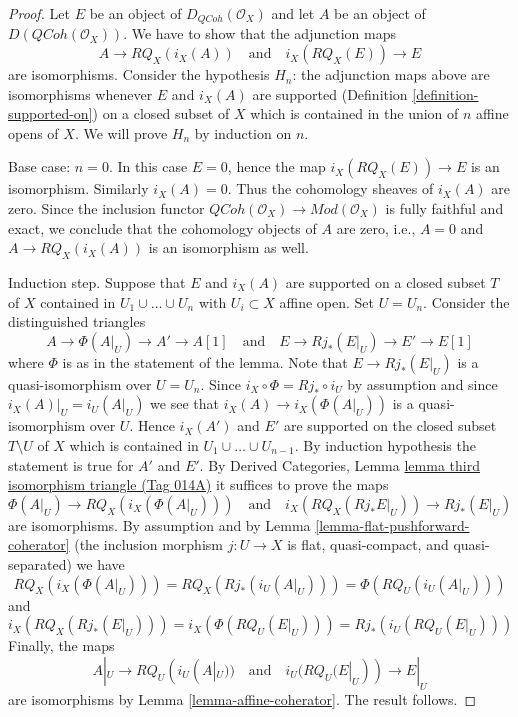 \documentclass{amsart}
\theoremstyle{plain}
\theoremstyle{definition}
\theoremstyle{remark}
\numberwithin{equation}{subsection}
\def\QCoh{\mathit{QCoh}}
\begin{document}
\begin{proof}
Let $E$ be an object of $D_\QCoh(\mathcal{O}_X)$ and
let $A$ be an object of $D(\QCoh(\mathcal{O}_X))$.
We have to show that the adjunction maps
$$
A \to RQ_X(i_X(A))
\quad\text{and}\quad
i_X(RQ_X(E)) \to E
$$
are isomorphisms. Consider the hypothesis
$H_n$: the adjunction maps above are isomorphisms
whenever $E$ and $i_X(A)$ are supported
(Definition \ref{definition-supported-on})
on a closed subset of $X$ which
is contained in the union of $n$ affine opens of $X$.
We will prove $H_n$ by induction on $n$.

\medskip\noindent
Base case: $n = 0$. In this case $E = 0$, hence the map
$i_X(RQ_X(E)) \to E$ is an isomorphism. Similarly $i_X(A) = 0$.
Thus the cohomology sheaves of $i_X(A)$ are zero. Since the inclusion
functor $\QCoh(\mathcal{O}_X) \to \textit{Mod}(\mathcal{O}_X)$
is fully faithful and exact, we conclude that the cohomology
objects of $A$ are zero, i.e., $A = 0$ and
$A \to RQ_X(i_X(A))$ is an isomorphism as well.

\medskip\noindent
Induction step. Suppose that $E$ and $i_X(A)$ are supported on a
closed subset $T$ of $X$ contained in $U_1 \cup \ldots \cup U_n$
with $U_i \subset X$ affine open. Set $U = U_n$.
Consider the distinguished triangles
$$
A \to \Phi(A|_U) \to A' \to A[1]
\quad\text{and}\quad
E \to Rj_*(E|_U) \to E' \to E[1]
$$
where $\Phi$ is as in the statement of the lemma.
Note that $E \to Rj_*(E|_U)$ is a quasi-isomorphism over $U = U_n$.
Since $i_X \circ \Phi = Rj_* \circ i_U$ by assumption
and since $i_X(A)|_U = i_U(A|_U)$
we see that $i_X(A) \to i_X(\Phi(A|_U))$ is a quasi-isomorphism over $U$.
Hence $i_X(A')$ and $E'$ are supported on the closed
subset $T \setminus U$ of $X$ which is contained in
$U_1 \cup \ldots \cup U_{n - 1}$.
By induction hypothesis the statement is true for $A'$ and $E'$. By
Derived Categories, Lemma \href{https://stacks.math.columbia.edu/tag/014A}{lemma third isomorphism triangle (Tag 014A)}
it suffices to prove the maps
$$
\Phi(A|_U) \to RQ_X(i_X(\Phi(A|_U)))
\quad\text{and}\quad
i_X(RQ_X(Rj_*E|_U)) \to Rj_*(E|_U)
$$
are isomorphisms. By assumption and by
Lemma \ref{lemma-flat-pushforward-coherator}
(the inclusion morphism $j : U \to X$ is flat, quasi-compact, and
quasi-separated) we have
$$
RQ_X(i_X(\Phi(A|_U))) = RQ_X(Rj_*(i_U(A|_U))) = \Phi(RQ_U(i_U(A|_U)))
$$
and
$$
i_X(RQ_X(Rj_*(E|_U))) = i_X(\Phi(RQ_U(E|_U))) = Rj_*(i_U(RQ_U(E|_U)))
$$
Finally, the maps
$$
A|_U \to RQ_U(i_U(A|_U))
\quad\text{and}\quad
i_U(RQ_U(E|_U)) \to E|_U
$$
are isomorphisms by Lemma \ref{lemma-affine-coherator}. The result follows.
\end{proof}
\end{document}
